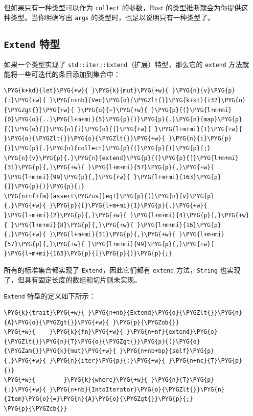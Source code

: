 但如果只有一种类型可以作为 \texttt{collect} 的参数，Rust 的类型推断就会为你提供这种类型。当你明确写出 \texttt{args} 的类型时，也足以说明只有一种类型了。

\subsection{\texttt{Extend} 特型}

如果一个类型实现了 \texttt{std::iter::Extend}（扩展）特型，那么它的 \texttt{extend} 方法就能将一些可迭代的条目添加到集合中：

\begin{Verbatim}[commandchars=\\\{\},breaklines=true,breakanywhere=true,fontsize=\codefont,xleftmargin=17bp]
\PYG{k+kd}{let}\PYG{+w}{ }\PYG{k}{mut}\PYG{+w}{ }\PYG{n}{v}\PYG{p}{:}\PYG{+w}{ }\PYG{n+nb}{Vec}\PYG{o}{\PYGZlt{}}\PYG{k+kt}{i32}\PYG{o}{\PYGZgt{}}\PYG{+w}{ }\PYG{o}{=}\PYG{+w}{ }\PYG{p}{(}\PYG{l+m+mi}{0}\PYG{o}{..}\PYG{l+m+mi}{5}\PYG{p}{)}\PYG{p}{.}\PYG{n}{map}\PYG{p}{(}\PYG{o}{|}\PYG{n}{i}\PYG{o}{|}\PYG{+w}{ }\PYG{l+m+mi}{1}\PYG{+w}{ }\PYG{o}{\PYGZlt{}}\PYG{o}{\PYGZlt{}}\PYG{+w}{ }\PYG{n}{i}\PYG{p}{)}\PYG{p}{.}\PYG{n}{collect}\PYG{p}{(}\PYG{p}{)}\PYG{p}{;}
\PYG{n}{v}\PYG{p}{.}\PYG{n}{extend}\PYG{p}{(}\PYG{p}{[}\PYG{l+m+mi}{31}\PYG{p}{,}\PYG{+w}{ }\PYG{l+m+mi}{57}\PYG{p}{,}\PYG{+w}{ }\PYG{l+m+mi}{99}\PYG{p}{,}\PYG{+w}{ }\PYG{l+m+mi}{163}\PYG{p}{]}\PYG{p}{)}\PYG{p}{;}
\PYG{n+nf+fm}{assert\PYGZus{}eq!}\PYG{p}{(}\PYG{n}{v}\PYG{p}{,}\PYG{+w}{ }\PYG{p}{[}\PYG{l+m+mi}{1}\PYG{p}{,}\PYG{+w}{ }\PYG{l+m+mi}{2}\PYG{p}{,}\PYG{+w}{ }\PYG{l+m+mi}{4}\PYG{p}{,}\PYG{+w}{ }\PYG{l+m+mi}{8}\PYG{p}{,}\PYG{+w}{ }\PYG{l+m+mi}{16}\PYG{p}{,}\PYG{+w}{ }\PYG{l+m+mi}{31}\PYG{p}{,}\PYG{+w}{ }\PYG{l+m+mi}{57}\PYG{p}{,}\PYG{+w}{ }\PYG{l+m+mi}{99}\PYG{p}{,}\PYG{+w}{ }\PYG{l+m+mi}{163}\PYG{p}{]}\PYG{p}{)}\PYG{p}{;}
\end{Verbatim}

所有的标准集合都实现了 \texttt{Extend}，因此它们都有 \texttt{extend} 方法，\texttt{String} 也实现了，但具有固定长度的数组和切片则未实现。

\texttt{Extend} 特型的定义如下所示：

\begin{Verbatim}[commandchars=\\\{\},breaklines=true,breakanywhere=true,fontsize=\codefont,xleftmargin=17bp]
\PYG{k}{trait}\PYG{+w}{ }\PYG{n+nb}{Extend}\PYG{o}{\PYGZlt{}}\PYG{n}{A}\PYG{o}{\PYGZgt{}}\PYG{+w}{ }\PYG{p}{\PYGZob{}}
\PYG{+w}{    }\PYG{k}{fn}\PYG{+w}{ }\PYG{n+nf}{extend}\PYG{o}{\PYGZlt{}}\PYG{n}{T}\PYG{o}{\PYGZgt{}}\PYG{p}{(}\PYG{o}{\PYGZam{}}\PYG{k}{mut}\PYG{+w}{ }\PYG{n+nb+bp}{self}\PYG{p}{,}\PYG{+w}{ }\PYG{n}{iter}\PYG{p}{:}\PYG{+w}{ }\PYG{n+nc}{T}\PYG{p}{)}
\PYG{+w}{        }\PYG{k}{where}\PYG{+w}{ }\PYG{n}{T}\PYG{p}{:}\PYG{+w}{ }\PYG{n+nb}{IntoIterator}\PYG{o}{\PYGZlt{}}\PYG{n}{Item}\PYG{o}{=}\PYG{n}{A}\PYG{o}{\PYGZgt{}}\PYG{p}{;}
\PYG{p}{\PYGZcb{}}
\end{Verbatim}

